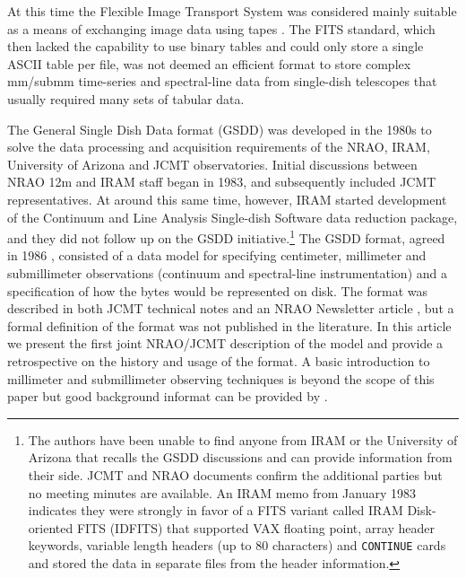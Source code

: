 \documentclass[final,authoryear,5p,times,twocolumn]{elsarticle}
\newcommand{\ascl}[1]{\href{http://www.ascl.net/#1}{ascl:#1}}
\begin{document}
At this time the Flexible Image Transport System
\citep[FITS;][]{1981A&AS...44..363W} was considered mainly
suitable as a means of exchanging image data using tapes
\citep{1980SPIE..264..298G}. The FITS standard, which then
lacked the capability to use binary tables and could only store a
single ASCII table per file, was not deemed an
efficient format to store complex mm/submm time-series and
spectral-line data from single-dish telescopes that usually required
many sets of tabular data.

The General Single Dish Data format (GSDD) was developed in the 1980s
to solve the data processing and acquisition requirements of the NRAO,
IRAM, University of Arizona and JCMT observatories.  Initial
discussions between NRAO 12m and IRAM staff began in 1983, and
subsequently included JCMT representatives. At around this same time,
however, IRAM started development of the Continuum and Line Analysis
Single-dish Software
\citep[][\ascl{1305.010}]{2005sf2a.conf..721P} data reduction package,
and they did not follow up on the GSDD initiative.\footnote{The
  authors have been unable to find anyone from IRAM or the University
  of Arizona that recalls the GSDD discussions and can provide
  information from their side. JCMT and NRAO documents confirm the
  additional parties but no meeting minutes are available. An IRAM
  memo from January 1983 indicates they were strongly in favor of a
  FITS variant called IRAM Disk-oriented FITS (IDFITS) that supported
  VAX floating point, array header keywords, variable length headers
  (up to 80 characters) and \texttt{CONTINUE} cards and stored the
  data in separate files from the header information.}  The GSDD
format, agreed in 1986 \citep[see e.g.,][]{mtdn84,1987NRAO30},
consisted of a data model for specifying centimeter, millimeter and
submillimeter observations (continuum and spectral-line
instrumentation) and a specification of how the bytes would be
represented on disk.  The format was described in both JCMT technical
notes \citep{mtdn84,mtdn85,SUN229} and an NRAO Newsletter article
\citep{1987NRAO30}, but a formal definition of the format was not
published in the literature. In this article we present the first
joint NRAO/JCMT description of the model and provide a retrospective
on the history and usage of the format.
A basic introduction to millimeter and submillimeter observing
techniques is beyond the scope of this paper but good background
informat can be provided by \citet{2002ASPC..278.....S}.
\end{document}
